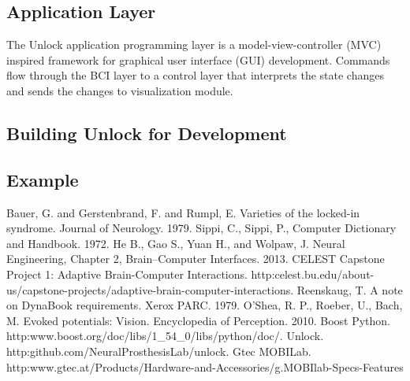 \documentclass[11pt]{article}
\begin{document}
\subsection{Application Layer}\label{applicationsec}

The Unlock application programming layer is a model-view-controller (MVC)~\cite{mvc, mvc2} inspired framework for graphical user interface (GUI) development.  Commands flow through the BCI layer to a control layer that interprets the state changes and sends the changes to visualization module.

\subsection{Building Unlock for Development}
\subsection{Example}

\begin{thebibliography}{99}
  Bauer, G. and Gerstenbrand, F. and Rumpl, E. Varieties of the locked-in syndrome. Journal of Neurology.  1979.
  Sippi, C.,  Sippi, P., Computer Dictionary and Handbook. 1972. 
  He B., Gao S., Yuan H., and Wolpaw, J.  Neural Engineering, Chapter 2, Brain–Computer Interfaces.  2013.
 CELEST Capstone Project 1: Adaptive Brain-Computer Interactions.  http:\/\/celest.bu.edu/about-us/capstone-projects/adaptive-brain-computer-interactions.
  Reenskaug, T. A note on DynaBook requirements. Xerox PARC.  1979.
 O’Shea, R. P., Roeber, U., Bach, M. Evoked potentials: Vision.  Encyclopedia of Perception. 2010.
 Boost Python.  http:\/\/www.boost.org/doc/libs/1\_54\_0/libs/python/doc/.
 Unlock.  http:\/\/github.com/NeuralProsthesisLab/unlock.
 Gtec MOBILab.  http:\/\/www.gtec.at/Products/Hardware-and-Accessories/g.MOBIlab-Specs-Features

\end{thebibliography}
\end{document}
